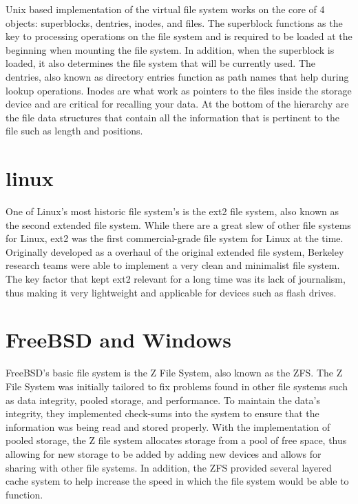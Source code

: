 \documentclass[draftclsnofoot, onecolumn] {report}
\begin{document}
Unix based implementation of the virtual file system works on the core of 4 objects: superblocks, dentries, inodes, and files.
The superblock functions as the key to processing operations on the file system and is required to be loaded at the beginning when mounting the file system.
In addition, when the superblock is loaded, it also determines the file system that will be currently used. 
The dentries, also known as directory entries function as path names that help during lookup operations.
Inodes are what work as pointers to the files inside the storage device and are critical for recalling your data. 
At the bottom of the hierarchy are the file data structures that contain all the information that is pertinent to the file such as length and positions. 

\section{linux}
One of Linux's most historic file system's is the ext2 file system, also known as the second extended file system.
While there are a great slew of other file systems for Linux, ext2 was the first commercial-grade file system for Linux at the time. 
Originally developed as a overhaul of the original extended file system, Berkeley research teams were able to implement a very clean and minimalist file system.
The key factor that kept ext2 relevant for a long time was its lack of journalism, thus making it very lightweight and applicable for devices such as flash drives.

\section{FreeBSD and Windows}
FreeBSD's basic file system is the Z File System, also known as the ZFS. 
The Z File System was initially tailored to fix problems found in other file systems such as data integrity, pooled storage, and performance. 
To maintain the data's integrity, they implemented check-sums into the system to ensure that the information was being read and stored properly.
With the implementation of pooled storage, the Z file system allocates storage from a pool of free space, thus allowing for new storage to be added by adding new devices and allows for sharing with other file systems.
In addition, the ZFS provided several layered cache system to help increase the speed in which the file system would be able to function. 
\end{document}
